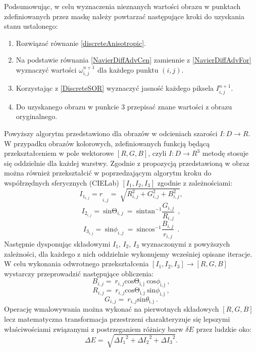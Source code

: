 \documentclass[12pt, twoside, openany]{report}
\theoremstyle{definition}
\begin{document}
Podsumowując, w celu wyznaczenia nieznanych wartości obrazu w punktach zdefiniowanych przez maskę należy powtarzać następujące kroki do uzyskania stanu ustalonego:
\begin{enumerate}
\item
Rozwiązać równanie \eqref{discreteAnisotropic}.
\item
Na podstawie równania \eqref{NavierDiffAdvCen} zamiennie z \eqref{NavierDiffAdvFor} wyznaczyć wartości $\omega_{i,j}^{n+1}$ dla każdego punktu $(i,j)$.
\item
Korzystając z \eqref{DiscreteSOR} wyznaczyć jasność każdego piksela $I_{i,j}^{n+1}$.
\item
Do uzyskanego obrazu w punkcie 3 przepisać znane wartości z obrazu oryginalnego.
\end{enumerate}
Powyższy algorytm przedstawiono dla obrazów w odcieniach szarości $I:D\to R$. W przypadku obrazów kolorowych, zdefiniowanych funkcją będącą przekształceniem w pole wektorowe $[R,G,B]$, czyli $I:D\to R^3$ metodę stosuje się oddzielnie dla każdej warstwy. Zgodnie z propozycją przedstawioną w \cite{fishelov2006image} obraz można również przekształcić w poprzedzającym algorytm kroku do współrzędnych sferycznych (CIELab) $\left[I_{1},I_{2},I_{3} \right]$ zgodnie z zależnościami:
\begin{equation}
{I_{1_{i,j}}=r}_{i,j}=\ \sqrt{R^2_{i,j}+G^2_{i,j}+B^2_{i,j}}
\label{TIone}
,
\end{equation}
\begin{equation}
I_{2_{i,j}}=\ {\mathrm{sin} {\mathrm{\Theta }}_{i,j}\ }=\ {\mathrm{sin} {{\mathrm{tan}}^{-1} \frac{G_{i,j}}{R_{i,j}}\ }\ } 
\label{TItwo}
,
\end{equation}
\begin{equation}
I_{3_{i,j}}=\ {\mathrm{sin} {\phi }_{i,j}\ }=\ {\mathrm{sin} {{\mathrm{cos}}^{-1} \frac{B_{i,j}}{r_{i,j}}\ }\ } 
\label{TIthree}
.
\end{equation}
Następnie dysponując składowymi $I_1$, $I_2$, $I_3$ wyznaczonymi z powyższych zależności, dla każdego z nich oddzielnie wykonujemy wcześniej opisane iteracje. W celu wykonania odwrotnego przekształcenia $\left[I_1,I_2,I_3 \right]\to\left[R,G,B\right]$ wystarczy przeprowadzić następujące obliczenia:
\begin{equation}
 B_{i,j}=\ r_{i,j}{\mathrm{cos} {\mathrm{\Theta }}_{\mathrm{i,j}}\ }{\mathrm{cos} {\phi }_{\mathrm{i,j}}\ }
\label{TInvIone}
,
\end{equation}
\begin{equation}
R_{i,j}=\ r_{i,j}{\mathrm{cos} {\mathrm{\Theta }}_{\mathrm{i,j}}\ }{\mathrm{sin} {\phi }_{\mathrm{i,j}}\ }
\label{TInvItwo},
\end{equation}
\begin{equation}
G_{i,j}=\ r_{i,j}{\mathrm{sin} {\theta }_{\mathrm{i,j}}\ } 
\label{TInvIthree}
.
\end{equation}
Operację wmalowywania można wykonać na pierwotnych składowych $[R,G,B]$ lecz matematyczna transformacja przestrzeni charakteryzuje się lepszymi właściwościami związanymi z postrzeganiem różnicy barw $\delta E$ przez ludzkie oko:
\begin{equation}
\Delta E=\ \sqrt{{\Delta I_1}^2+{\Delta I_2}^2+{\Delta I_3}^2}
\label{deltaE}
.
\end{equation}
\end{document}

